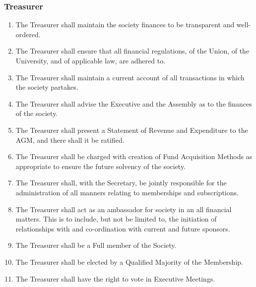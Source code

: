 \documentclass{scrartcl}
\begin{document}
            \subsubsection{Treasurer}
                \label{executive--positions--treasurer}
                \begin{enumerate}
                    \item The Treasurer shall maintain the society finances to be transparent and well-ordered.
                    \item The Treasurer shall ensure that all financial regulations, of the Union, of the University, and of applicable law, are adhered to.
                    \item The Treasurer shall maintain a current account of all transactions in which the society partakes.
                    \item The Treasurer shall advise the Executive and the Assembly as to the finances of the society.
                    \item The Treasurer shall present a Statement of Revenue and Expenditure to the AGM, and there shall it be ratified.
                    \item The Treasurer shall be charged with creation of Fund Acquisition Methods as appropriate to ensure the future solvency of the society.
                    \item The Treasurer shall, with the Secretary, be jointly responsible for the administration of all manners relating to memberships and subscriptions.
                    \item The Treasurer shall act as an ambassador for society in an all financial matters. This is to include, but not be limited to, the initiation of relationships with and co-ordination with current and future sponsors.
                    \item The Treasurer shall be a Full member of the Society.
                    \item The Treasurer shall be elected by a Qualified Majority of the Membership.
                    \item The Treasurer shall have the right to vote in Executive Meetings.
                \end{enumerate}
\end{document}
